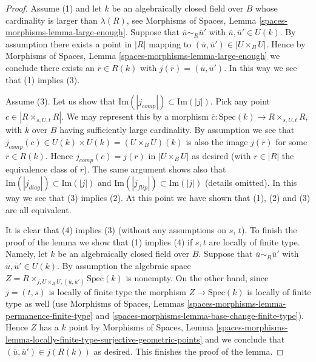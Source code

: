 \begin{proof}
\medskip\noindent
Assume (1) and let $k$ be an algebraically closed field over $B$ whose
cardinality is larger than $\lambda(R)$, see
Morphisms of Spaces, Lemma \ref{spaces-morphisms-lemma-large-enough}.
Suppose that $\overline{u} \sim_R \overline{u}'$ with
$\overline{u}, \overline{u}' \in U(k)$. By assumption there exists
a point in $|R|$ mapping to $(\overline{u}, \overline{u}') \in |U \times_B U|$.
Hence by 
Morphisms of Spaces, Lemma \ref{spaces-morphisms-lemma-large-enough}
we conclude there exists an $\overline{r} \in R(k)$ with
$j(\overline{r}) = (\overline{u}, \overline{u}')$. In this way we see
that (1) implies (3).

\medskip\noindent
Assume (3). Let us show that
$\text{Im}(|j_{comp}|) \subset \text{Im}(|j|)$. Pick any point
$c \in |R \times_{s, U, t} R|$. We may represent this by a morphism
$\overline{c} : \text{Spec}(k) \to R \times_{s, U, t} R$, with $k$ over $B$
having sufficiently large cardinality. By assumption we see that
$j_{comp}(\overline{c}) \in U(k) \times U(k) = (U \times_B U)(k)$
is also the image $j(\overline{r})$ for some $\overline{r} \in R(k)$.
Hence $j_{comp}(c) = j(r)$ in $|U \times_B U|$ as desired (with
$r \in |R|$ the equivalence class of $\overline{r}$). The same argument
shows also that $\text{Im}(|j_{diag}|) \subset \text{Im}(|j|)$ and
$\text{Im}(|j_{flip}|) \subset \text{Im}(|j|)$ (details omitted).
In this way we see that (3) implies (2). At this point we have
shown that (1), (2) and (3) are all equivalent.

\medskip\noindent
It is clear that (4) implies (3) (without any assumptions on $s$, $t$).
To finish the proof of the lemma we show that (1) implies (4) if $s, t$
are locally of finite type. Namely, let $k$ be an algebraically closed
field over $B$. Suppose that $\overline{u} \sim_R \overline{u}'$ with
$\overline{u}, \overline{u}' \in U(k)$. By assumption the algebraic space
$Z = R \times_{j, U \times_B U, (\overline{u}, \overline{u}')} \text{Spec}(k)$
is nonempty. On the other hand, since $j = (t, s)$ is locally of finite type
the morphism $Z \to \text{Spec}(k)$ is locally of finite type as well (use
Morphisms of Spaces, Lemmas \ref{spaces-morphisms-lemma-permanence-finite-type}
and \ref{spaces-morphisms-lemma-base-change-finite-type}).
Hence $Z$ has a $k$ point by
Morphisms of Spaces, Lemma
\ref{spaces-morphisms-lemma-locally-finite-type-surjective-geometric-points}
and we conclude that $(\overline{u}, \overline{u}') \in j(R(k))$
as desired. This finishes the proof of the lemma.
\end{proof}

